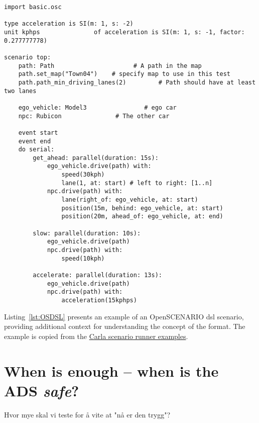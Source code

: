 \begin{lstlisting}[label={lst:OSDSL}, caption={An example of an OpenSCENARIO DSL scenario.}]
import basic.osc

type acceleration is SI(m: 1, s: -2)
unit kphps               of acceleration is SI(m: 1, s: -1, factor: 0.277777778)

scenario top:
    path: Path                      # A path in the map
    path.set_map("Town04")    # specify map to use in this test
    path.path_min_driving_lanes(2)         # Path should have at least two lanes

    ego_vehicle: Model3                # ego car
    npc: Rubicon               # The other car

    event start
    event end
    do serial:
        get_ahead: parallel(duration: 15s):
            ego_vehicle.drive(path) with:
                speed(30kph)
                lane(1, at: start) # left to right: [1..n]
            npc.drive(path) with:
                lane(right_of: ego_vehicle, at: start)
                position(15m, behind: ego_vehicle, at: start)
                position(20m, ahead_of: ego_vehicle, at: end)       

        slow: parallel(duration: 10s):
            ego_vehicle.drive(path)
            npc.drive(path) with:
                speed(10kph)

        accelerate: parallel(duration: 13s):
            ego_vehicle.drive(path)
            npc.drive(path) with:
                acceleration(15kphps)
\end{lstlisting}

Listing~\ref{lst:OSDSL} presents an example of an OpenSCENARIO \acrshort{dsl} scenario, providing
additional context for understanding the concept of the format. The example is copied
from the \href{https://github.com/carla-simulator/scenario_runner/blob/master/srunner/examples/acceleration.osc}{Carla scenario runner examples}.

\section{When is enough -- when is the ADS \emph{safe}?}

Hvor mye skal vi teste for å vite at "nå er den trygg"?